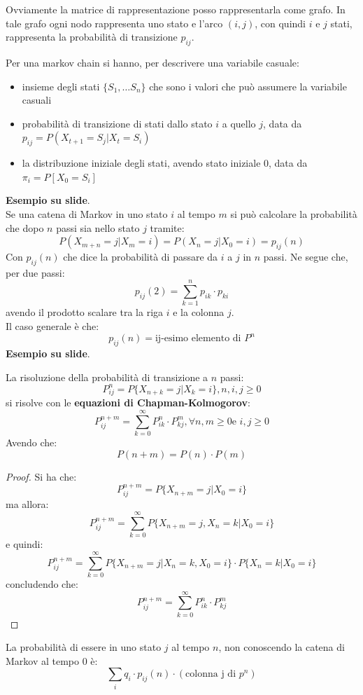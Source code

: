\documentclass[a4paper,12pt, oneside]{book}
\begin{document}
Ovviamente la matrice di rappresentazione posso rappresentarla come grafo.
In tale grafo ogni nodo rappresenta uno
stato e l'arco $(i,j)$, con quindi $i$ e $j$ stati, rappresenta la probabilità
di transizione $p_{ij}$.
\begin{definizione}
  Per una markov chain si hanno, per descrivere una variabile casuale:
  \begin{itemize}
    \item insieme degli stati $\{S_1,\ldots S_n\}$ che sono i valori che può
    assumere la variabile casuali
    \item probabilità di transizione di stati dallo stato $i$ a quello $j$, data
    da $p_{ij}=P(X_{t+1}=S_j|X_t=S_i)$
    \item la distribuzione iniziale degli stati, avendo stato iniziale $0$, data
    da $\pi_i=P[X_0=S_i]$ 
  \end{itemize}
\end{definizione}
\textbf{Esempio su slide}.\\
Se una catena di Markov in uno stato $i$ al tempo $m$ si può calcolare la
probabilità che dopo $n$ passi sia nello stato $j$ tramite:
\[P(X_{m+n}=j|X_m=i)=P(X_n=j|X_0=i)=p_{ij}(n)\]
Con $p_{ij}(n)$ che dice la probabilità di passare da $i$ a $j$ in $n$ passi. Ne
segue che, per due passi:
\[p_{ij}(2)=\sum_{k=1}^n p_{ik}\cdot p_{ki}\]
avendo il prodotto scalare tra la riga $i$ e la colonna $j$.\\
Il caso generale è che:
\[p_{ij}(n)=\mbox{ij-esimo elemento di } P^n\]
\textbf{Esempio su slide}.\\
\begin{teorema}
  La risoluzione della probabilità di transizione a $n$ passi:
  \[P_{ij}^n=P\{X_{n+k}=j|X_k=i\},n,i,j\geq 0\]
  si risolve con le \textbf{equazioni di Chapman-Kolmogorov}:
  \[P_{ij}^{n+m}=\sum_{k=0}^\infty P_{ik}^n\cdot P_{kj}^m,\forall n,m\geq 0\mbox{
      e } i,j\geq 0\]
  Avendo che:
  \[P(n+m)=P(n)\cdot P(m)\]
\end{teorema}
\begin{proof}
  Si ha che:
  \[P_{ij}^{n+m}=P\{X_{n+m}=j|X_0=i\}\]
  ma allora:
  \[P_{ij}^{n+m}=\sum_{k=0}^\infty P\{X_{n+m}=j,X_n=k|X_0=i\}\]
  e quindi:
  \[P_{ij}^{n+m}=\sum_{k=0}^\infty P\{X_{n+m}=j|X_n=k,X_0=i\}\cdot
    P\{X_n=k|X_0=i\}\]
  concludendo che:
  \[P_{ij}^{n+m}=\sum_{k=0}^\infty P_{ik}^n\cdot P_{kj}^m\]
\end{proof}
\begin{teorema}
  La probabilità di essere in uno stato $j$ al tempo $n$, non conoscendo la
  catena di Markov al tempo 0 è:
  \[\sum_i q_i\cdot p_{ij}(n)\cdot(\mbox{colonna j di }p^n)\]
\end{teorema}
\end{document}
